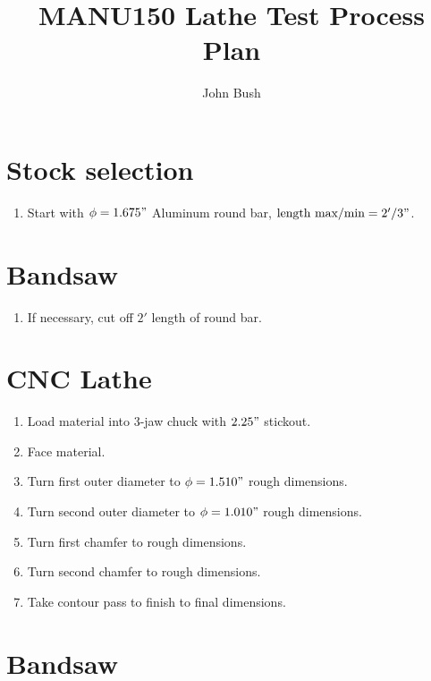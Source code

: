 \documentclass{article}
\begin{document}
\title{MANU150 Lathe Test Process Plan} 
\author{John Bush}

\maketitle

\section*{Stock selection}

\begin{enumerate}
	\item Start with $\phi = 1.675"$ Aluminum round bar, $\text{length max/min} = 2'/3"$.
\end{enumerate}

\section*{Bandsaw}

\begin{enumerate}[resume]
	\item If necessary, cut off $2'$ length of round bar.
\end{enumerate}

\section*{CNC Lathe} 

\begin{enumerate}[resume]
	\item Load material into 3-jaw chuck with $2.25"$ stickout.

	\item Face material.

	\item Turn first outer diameter to $\phi = 1.510"$ rough dimensions.

	\item Turn second outer diameter to $\phi = 1.010"$ rough dimensions.

	\item Turn first chamfer to rough dimensions.

	\item Turn second chamfer to rough dimensions.

	\item Take contour pass to finish to final dimensions.
\end{enumerate}

\section*{Bandsaw}
\end{document}
